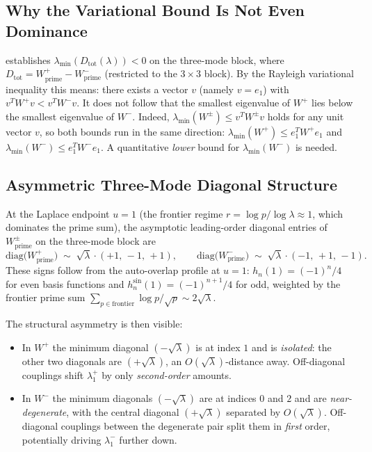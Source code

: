\documentclass[11pt,a4paper]{article}
\theoremstyle{remark}
\theoremstyle{plain}
\begin{document}
\subsection{Why the Variational Bound Is Not Even Dominance}

 establishes
$\lambda_{\min}(D_{\mathrm{tot}}(\lambda))<0$ on the three-mode block, where
$D_{\mathrm{tot}}=W^+_{\mathrm{prime}}-W^-_{\mathrm{prime}}$ (restricted to the
$3\times3$ block). By the Rayleigh variational inequality this means: there
exists a vector $v$ (namely $v=e_1$) with $v^TW^+v<v^TW^-v$. It does not
follow that the smallest eigenvalue of $W^+$ lies below the smallest eigenvalue
of $W^-$. Indeed, $\lambda_{\min}(W^\pm)\leq v^TW^\pm v$ holds for any unit
vector $v$, so both bounds run in the same direction:
$\lambda_{\min}(W^+)\leq e_1^TW^+e_1$ and $\lambda_{\min}(W^-)\leq e_1^TW^-e_1$.
A quantitative \emph{lower} bound for $\lambda_{\min}(W^-)$ is needed.

\subsection{Asymmetric Three-Mode Diagonal Structure}

At the Laplace endpoint $u=1$ (the frontier regime
$r=\log p/\log\lambda\approx 1$, which dominates the prime sum), the asymptotic
leading-order diagonal entries of $W^\pm_{\mathrm{prime}}$ on the three-mode
block are
\[
  \mathrm{diag}\bigl(W^+_{\mathrm{prime}}\bigr)
  \;\sim\; \sqrt\lambda\cdot(+1,\,-1,\,+1),
  \qquad
  \mathrm{diag}\bigl(W^-_{\mathrm{prime}}\bigr)
  \;\sim\; \sqrt\lambda\cdot(-1,\,+1,\,-1).
\]
These signs follow from the auto-overlap profile at $u=1$:
$h_n(1)=(-1)^n/4$ for even basis functions and $h_n^{\sin}(1)=(-1)^{n+1}/4$
for odd, weighted by the frontier prime sum
$\sum_{p\in\text{frontier}}\log p/\sqrt p\sim 2\sqrt\lambda$.

The structural asymmetry is then visible:
\begin{itemize}[leftmargin=*]
  \item In $W^+$ the minimum diagonal $(-\sqrt\lambda)$ is at index $1$ and is
  \emph{isolated}: the other two diagonals are $(+\sqrt\lambda)$, an
  $O(\sqrt\lambda)$-distance away. Off-diagonal couplings shift $\lambda_1^+$
  by only \emph{second-order} amounts.
  \item In $W^-$ the minimum diagonals $(-\sqrt\lambda)$ are at indices $0$ and
  $2$ and are \emph{near-degenerate}, with the central diagonal $(+\sqrt\lambda)$
  separated by $O(\sqrt\lambda)$. Off-diagonal couplings between the degenerate
  pair split them in \emph{first} order, potentially driving $\lambda_1^-$
  further down.
\end{itemize}
\end{document}

